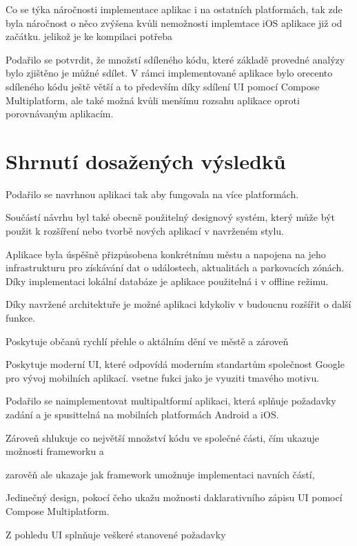 Co se týka náročnosti implementace aplikac i na ostatních platformách, tak zde byla náročnost
o něco zvýšena kvůli nemožnosti implemtace iOS aplikace již od začátku. jelikož je ke kompilaci potřeba 


Podařilo se potvrdit, že množstí sdíleného kódu, které základě provedné analýzy bylo zjištěno je můžné sdílet. V rámci implementované aplikace
bylo orecento sdíleného kódu ještě větší a to především díky sdílení UI pomocí Compose Multiplatform, ale také možná kvůli menšímu rozsahu
aplikace oproti porovnávaným aplikacím. 




\section{Shrnutí dosažených výsledků}
Podařilo se navrhnou aplikaci tak aby fungovala na více platformách.  

Součástí návrhu byl také obecně použitelný designový systém, který může být použit k rozšíření nebo tvorbě nových aplikací v navrženém stylu.

Aplikace byla úspěšně přizpůsobena konkrétnímu městu a napojena na jeho infrastrukturu pro získávání dat o událostech, 
aktualitách a parkovacích zónách. Díky implementaci lokální databáze je aplikace použitelná i v offline režimu.

Díky navržené architektuře je možné aplikaci kdykoliv v budoucnu rozšířit o další funkce. 

Poskytuje občanů rychlí přehle o aktálním dění ve městě a zároveň 

Poskytuje moderní UI, které odpovídá moderním standartům společnost Google pro vývoj mobilních aplikací.
vsetne fukci jako je vyuziti tmavého motivu.

Podařilo se naimplementovat multipaltformí aplikaci, která splňuje požadavky zadání a je spusittelná na mobilních 
platformách Android a iOS. 

Zároveň shlukuje co největší množství kódu ve společné části, čím ukazuje možnosti frameworku a 

zarověň ale ukazaje jak framework umožnuje implementaci navních částí, 

Jedinečný design, pokocí čeho ukažu možnosti daklarativního zápisu UI pomocí Compose Multiplatform.

Z pohledu UI splnňuje veškeré stanovené požadavky

